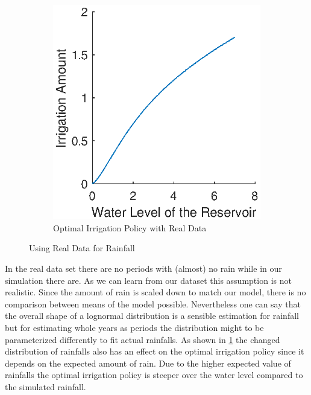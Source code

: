 \documentclass[12pt, a4paper, oneside]{article}
\begin{document}
\begin{figure}[h]
\begin{subfigure}{.5\textwidth}
	\includegraphics[width=1\textwidth]{figures/optimalIrrigationPolicy-real-data.eps}
	\caption{Optimal Irrigation Policy with Real Data}
	\label{fig:optimalIrrigationPolicy-real-data}
\end{subfigure}
\caption{Using Real Data for Rainfall}
\label{fig:real-data}
\end{figure}
In the real data set there are no periods with (almost) no rain while in our simulation there are.
As we can learn from our dataset this assumption is not realistic.
Since the amount of rain is scaled down to match our model, there is no comparison between means of the model possible.
Nevertheless one can say that the overall shape of a lognormal distribution is a sensible estimation for rainfall but for estimating whole years as periods the distribution might to be parameterized differently to fit actual rainfalls. 
As shown in \ref{fig:optimalIrrigationPolicy-real-data} the changed distribution of rainfalls also has an effect on the optimal irrigation policy since it depends on the expected amount of rain.
Due to the higher expected value of rainfalls the optimal irrigation policy is steeper over the water level compared to the simulated rainfall.

\clearpage	
\newpage
\end{document}
